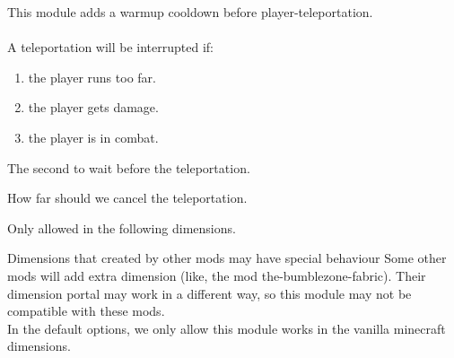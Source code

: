 
This module adds a warmup cooldown before player-teleportation.\\
\\
A teleportation will be interrupted if:
\begin{enumerate}
    \item the player runs too far.
    \item the player gets damage.
    \item the player is in combat.
\end{enumerate}

The second to wait before the teleportation.

How far should we cancel the teleportation.

Only allowed in the following dimensions.

\begin{warn}{Dimensions that created by other mods may have special behaviour}
    Some other mods will add extra dimension (like, the mod the-bumblezone-fabric).
    Their dimension portal may work in a different way, so this module may not be compatible with these mods.\\
    In the default options, we only allow this module works in the vanilla minecraft dimensions.
\end{warn}
